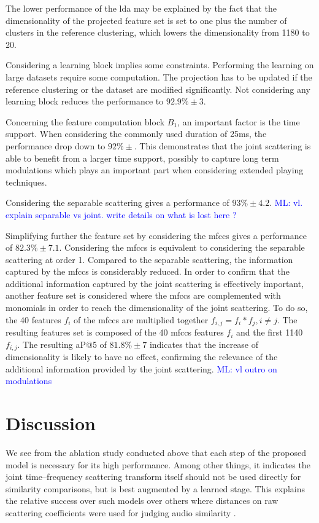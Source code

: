 \documentclass{bmcart}
\newcommand{\ml}[1]{\textcolor{blue}{ML: #1}}
\begin{document}
The lower performance of the lda may be explained by the fact that the dimensionality of the projected feature set is set to one plus the number of clusters in the reference clustering, which lowers the dimensionality from 1180 to 20.

Considering a learning block implies some constraints. Performing the learning on large datasets require some computation. The projection has to be updated if the reference clustering or the dataset are modified significantly. Not considering any learning block reduces the performance to $92.9\% \pm 3$.

Concerning the feature computation block $B_1$, an important factor is the time support. When considering the commonly used duration of 25ms, the performance drop down to $92\% \pm$. This demonstrates that the joint scattering is able to benefit from a larger time support, possibly to capture long term modulations which plays an important part when considering extended playing techniques.

Considering the separable scattering gives a performance of $93\% \pm 4.2$. \ml{ vl. explain separable vs joint. write details on what is lost here ?}

Simplifying further the feature set by considering the mfccs gives a performance of $82.3\% \pm 7.1$. Considering the mfccs is equivalent to considering the separable scattering at order 1. Compared to the separable scattering, the information captured by the mfccs is considerably reduced. In order to confirm that the additional information captured by the joint scattering is effectively important, another feature set is considered where the mfccs are complemented with monomials in order to reach the dimensionality of the joint scattering. To do so, the 40 features $f_i$ of the mfccs are multiplied together $f_{i, j} = f_i*f_j, i \neq j$. The resulting features set is composed of the 40 mfccs features $f_i$ and the first 1140 $f_{i, j}$. The resulting aP@5 of $81.8\% \pm 7$ indicates that the increase of dimensionality is likely to have no effect, confirming the relevance of the additional information provided by the joint scattering. \ml{vl outro on modulations}

\section*{Discussion}
\label{sec:discussion}

We see from the ablation study conducted above that each step of the proposed model is necessary for its high performance.
Among other things, it indicates the joint time--frequency scattering transform itself should not be used directly for similarity comparisons, but is best augmented by a learned stage.
This explains the relative success over such models \cite{lostanlen2018jasmp,lostanlen2018extended} over others where distances on raw scattering coefficients were used for judging audio similarity \cite{bauge2013representing}.
\end{document}
